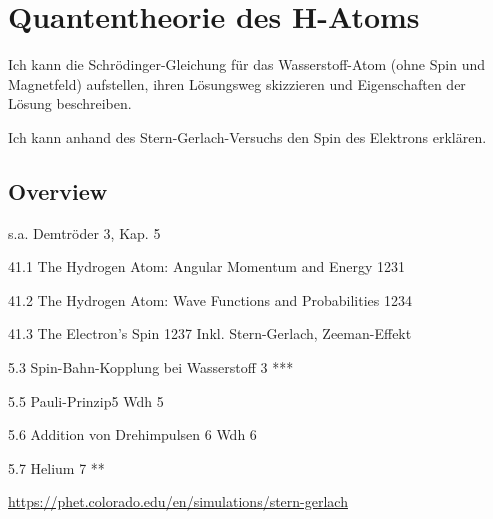 \renewcommand{\lastmod}{10. September 2024}
\renewcommand{\chapterauthors}{Markus Lippitz}

\chapter{Quantentheorie des H-Atoms}




Ich kann die Schrödinger-Gleichung für das Wasserstoff-Atom (ohne Spin und Magnetfeld) aufstellen, ihren Lösungsweg skizzieren und Eigenschaften der Lösung beschreiben.

Ich kann anhand des Stern-Gerlach-Versuchs den Spin des Elektrons erklären.


\section{Overview}

s.a. Demtröder 3, Kap. 5

41.1 The Hydrogen Atom: Angular Momentum and Energy 1231

41.2 The Hydrogen Atom: Wave Functions and Probabilities 1234

41.3 The Electron's Spin 1237
Inkl. Stern-Gerlach, Zeeman-Effekt

5.3 Spin-Bahn-Kopplung bei Wasserstoff 3	***	

5.5 Pauli-Prinzip5	Wdh	5 

5.6 Addition von Drehimpulsen 6	Wdh	6 

5.7 Helium 7	**	


\url{https://phet.colorado.edu/en/simulations/stern-gerlach}



\printbibliography[segment=\therefsegment,heading=subbibliography]
